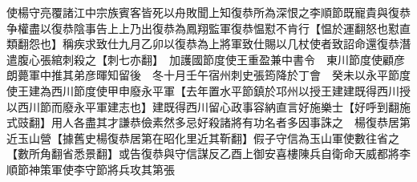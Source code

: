使楊守亮覆諸江中宗族賓客皆死以舟敗聞上知復恭所為深恨之李順節既寵貴與復恭争權盡以復恭陰事告上上乃出復恭為鳳翔監軍復恭愠懟不肯行【愠於運翻怒也懟直類翻怨也】稱疾求致仕九月乙卯以復恭為上將軍致仕賜以几杖使者致詔命還復恭潛遣腹心張綰刺殺之【刺七亦翻】　加護國節度使王重盈兼中書令　東川節度使顧彦朗薨軍中推其弟彦暉知留後　冬十月壬午宿州刺史張筠降於丁會　癸未以永平節度使王建為西川節度使甲申廢永平軍【去年置水平節鎮於邛州以授王建建既得西川授以西川節而廢永平軍建志也】建既得西川留心政事容納直言好施樂士【好呼到翻施式豉翻】用人各盡其才謙恭儉素然多忌好殺諸將有功名者多因事誅之　楊復恭居第近玉山營【據舊史楊復恭居第在昭化里近其靳翻】假子守信為玉山軍使數往省之【數所角翻省悉景翻】或告復恭與守信謀反乙酉上御安喜樓陳兵自衛命天威都將李順節神策軍使李守節將兵攻其第張